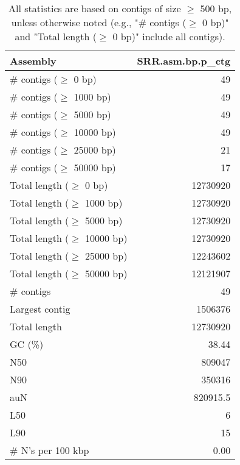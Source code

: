 \documentclass[12pt,a4paper]{article}
\begin{document}
\begin{table}[ht]
\begin{center}
\caption{All statistics are based on contigs of size $\geq$ 500 bp, unless otherwise noted (e.g., "\# contigs ($\geq$ 0 bp)" and "Total length ($\geq$ 0 bp)" include all contigs).}
\begin{tabular}{|l*{1}{|r}|}
\hline
Assembly & SRR.asm.bp.p\_ctg \\ \hline
\# contigs ($\geq$ 0 bp) & 49 \\ \hline
\# contigs ($\geq$ 1000 bp) & 49 \\ \hline
\# contigs ($\geq$ 5000 bp) & 49 \\ \hline
\# contigs ($\geq$ 10000 bp) & 49 \\ \hline
\# contigs ($\geq$ 25000 bp) & 21 \\ \hline
\# contigs ($\geq$ 50000 bp) & 17 \\ \hline
Total length ($\geq$ 0 bp) & 12730920 \\ \hline
Total length ($\geq$ 1000 bp) & 12730920 \\ \hline
Total length ($\geq$ 5000 bp) & 12730920 \\ \hline
Total length ($\geq$ 10000 bp) & 12730920 \\ \hline
Total length ($\geq$ 25000 bp) & 12243602 \\ \hline
Total length ($\geq$ 50000 bp) & 12121907 \\ \hline
\# contigs & 49 \\ \hline
Largest contig & 1506376 \\ \hline
Total length & 12730920 \\ \hline
GC (\%) & 38.44 \\ \hline
N50 & 809047 \\ \hline
N90 & 350316 \\ \hline
auN & 820915.5 \\ \hline
L50 & 6 \\ \hline
L90 & 15 \\ \hline
\# N's per 100 kbp & 0.00 \\ \hline
\end{tabular}
\end{center}
\end{table}
\end{document}
